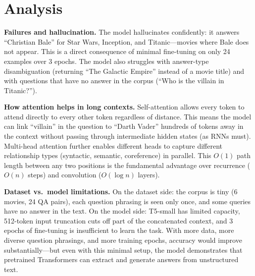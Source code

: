 \documentclass[11pt,a4paper]{article}
\begin{document}
\section{Analysis}

\textbf{Failures and hallucination.} The model hallucinates confidently: it answers ``Christian Bale'' for Star Wars, Inception, and Titanic---movies where Bale does not appear. This is a direct consequence of minimal fine-tuning on only 24 examples over 3 epochs. The model also struggles with answer-type disambiguation (returning ``The Galactic Empire'' instead of a movie title) and with questions that have no answer in the corpus (``Who is the villain in Titanic?'').

\textbf{How attention helps in long contexts.} Self-attention allows every token to attend directly to every other token regardless of distance. This means the model can link ``villain'' in the question to ``Darth Vader'' hundreds of tokens away in the context without passing through intermediate hidden states (as RNNs must). Multi-head attention further enables different heads to capture different relationship types (syntactic, semantic, coreference) in parallel. This $O(1)$ path length between any two positions is the fundamental advantage over recurrence ($O(n)$ steps) and convolution ($O(\log n)$ layers).

\textbf{Dataset vs.\ model limitations.} On the dataset side: the corpus is tiny (6 movies, 24 QA pairs), each question phrasing is seen only once, and some queries have no answer in the text. On the model side: T5-small has limited capacity, 512-token input truncation cuts off part of the concatenated context, and 3 epochs of fine-tuning is insufficient to learn the task. With more data, more diverse question phrasings, and more training epochs, accuracy would improve substantially---but even with this minimal setup, the model demonstrates that pretrained Transformers can extract and generate answers from unstructured text.
\end{document}
